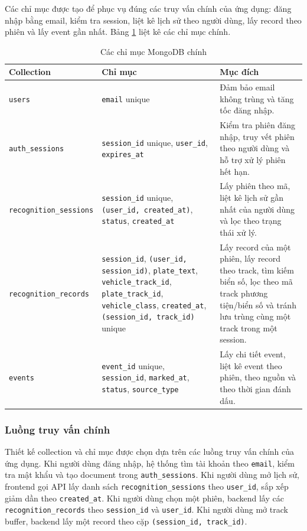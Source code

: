Các chỉ mục được tạo để phục vụ đúng các truy vấn chính của ứng dụng: đăng nhập bằng email, kiểm tra session, liệt kê lịch sử theo người dùng, lấy record theo phiên và lấy event gần nhất. Bảng \ref{tab:mongodb-indexes} liệt kê các chỉ mục chính.

\begin{table}[H]
\centering
\caption{Các chỉ mục MongoDB chính}
\label{tab:mongodb-indexes}
\begin{tabular}{|p{3.8cm}|p{5.2cm}|p{5.2cm}|}
\hline
\textbf{Collection} & \textbf{Chỉ mục} & \textbf{Mục đích} \\
\hline
\texttt{users} & \texttt{email} unique & Đảm bảo email không trùng và tăng tốc đăng nhập. \\
\hline
\texttt{auth\_sessions} & \texttt{session\_id} unique, \texttt{user\_id}, \texttt{expires\_at} & Kiểm tra phiên đăng nhập, truy vết phiên theo người dùng và hỗ trợ xử lý phiên hết hạn. \\
\hline
\texttt{recognition\_sessions} & \texttt{session\_id} unique, \texttt{(user\_id, created\_at)}, \texttt{status}, \texttt{created\_at} & Lấy phiên theo mã, liệt kê lịch sử gần nhất của người dùng và lọc theo trạng thái xử lý. \\
\hline
\texttt{recognition\_records} & \texttt{session\_id}, \texttt{(user\_id, session\_id)}, \texttt{plate\_text}, \texttt{vehicle\_track\_id}, \texttt{plate\_track\_id}, \texttt{vehicle\_class}, \texttt{created\_at}, \texttt{(session\_id, track\_id)} unique & Lấy record của một phiên, lấy record theo track, tìm kiếm biển số, lọc theo mã track phương tiện/biển số và tránh lưu trùng cùng một track trong một session. \\
\hline
\texttt{events} & \texttt{event\_id} unique, \texttt{session\_id}, \texttt{marked\_at}, \texttt{status}, \texttt{source\_type} & Lấy chi tiết event, liệt kê event theo phiên, theo nguồn và theo thời gian đánh dấu. \\
\hline
\end{tabular}
\end{table}

\subsubsection{Luồng truy vấn chính}

Thiết kế collection và chỉ mục được chọn dựa trên các luồng truy vấn chính của ứng dụng. Khi người dùng đăng nhập, hệ thống tìm tài khoản theo \texttt{email}, kiểm tra mật khẩu và tạo document trong \texttt{auth\_sessions}. Khi người dùng mở lịch sử, frontend gọi API lấy danh sách \texttt{recognition\_sessions} theo \texttt{user\_id}, sắp xếp giảm dần theo \texttt{created\_at}. Khi người dùng chọn một phiên, backend lấy các \texttt{recognition\_records} theo \texttt{session\_id} và \texttt{user\_id}. Khi người dùng mở track buffer, backend lấy một record theo cặp \texttt{(session\_id, track\_id)}.

